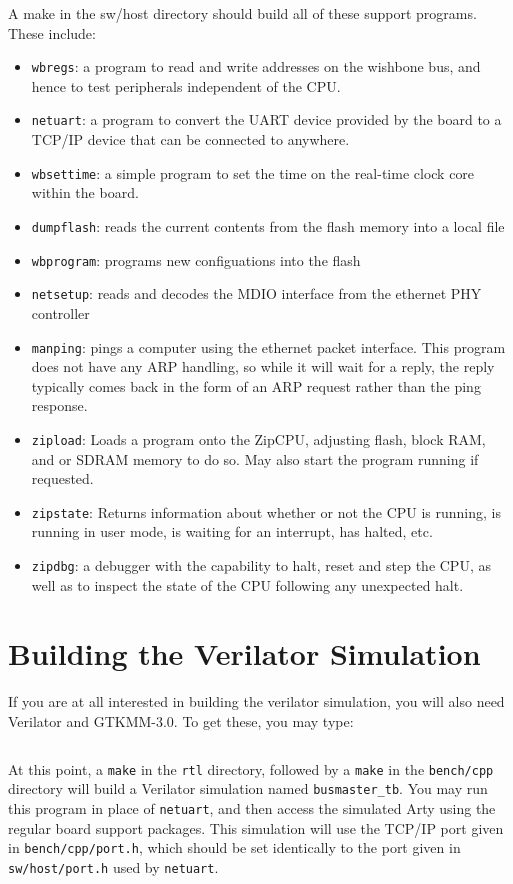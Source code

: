 \documentclass{gqtekspec}
\begin{document}

A make in the sw/host directory should build all of these support programs.
These include:
\begin{itemize}
\item {\tt wbregs}: a program to read and write addresses on the wishbone bus,
	and hence to test peripherals independent of the CPU.
\item {\tt netuart}: a program to convert the UART device provided by the board
	to a TCP/IP device that can be connected to anywhere.
\item {\tt wbsettime}: a simple program to set the time on the real-time clock
	core within the board.
\item {\tt dumpflash}: reads the current contents from the flash memory into a
 	local file
\item {\tt wbprogram}: programs new configuations into the flash
\item {\tt netsetup}: reads and decodes the MDIO interface from the ethernet
	PHY controller
\item {\tt manping}: pings a computer using the ethernet packet interface.
	This program does not have any ARP handling, so while it will wait
	for a reply, the reply typically comes back in the form of an ARP
	request rather than the ping response.
\item {\tt zipload}: Loads a program onto the ZipCPU, adjusting flash, block
	RAM, and or SDRAM memory to do so.  May also start the program running
	if requested.
\item {\tt zipstate}: Returns information about whether or not the CPU is
	running, is running in user mode, is waiting for an interrupt,
	has halted, etc.
\item {\tt zipdbg}: a debugger with the capability to halt, reset and step
	the CPU, as well as to inspect the state of the CPU following any
	unexpected halt.
\end{itemize}

\section{Building the Verilator Simulation}
If you are at all interested in building the verilator simulation, you will 
also need Verilator and GTKMM-3.0.  To get these, you may type:
\begin{lstlisting}[language=bash]
% sudo apt-get install verilator libgtkmm-3.0-dev
\end{lstlisting}
At this point, a {\tt make} in the {\tt rtl} directory, followed by a
{\tt make} in the {\tt bench/cpp} directory will build a Verilator simulation
named {\tt busmaster\_tb}.  You may run this program in place of {\tt netuart},
and then access the simulated Arty using the regular board support packages.
This simulation will use the TCP/IP port given in {\tt bench/cpp/port.h}, which
should be set identically to the port given in {\tt sw/host/port.h} used by
{\tt netuart}.
\end{document}
